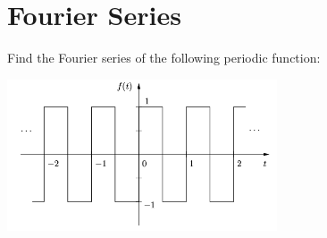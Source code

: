 \documentclass[a4paper, 10pt]{article}
\begin{document}
\subject[2110203 - Computer Engineering Mathematics II]


\section{Fourier Series}



\begin{problem}
Find the Fourier series of the following periodic function:

\begin{center}
    \includegraphics[width=0.6\textwidth]{images/problem_1_reference.png}
\end{center}
\end{problem}
\end{document}
